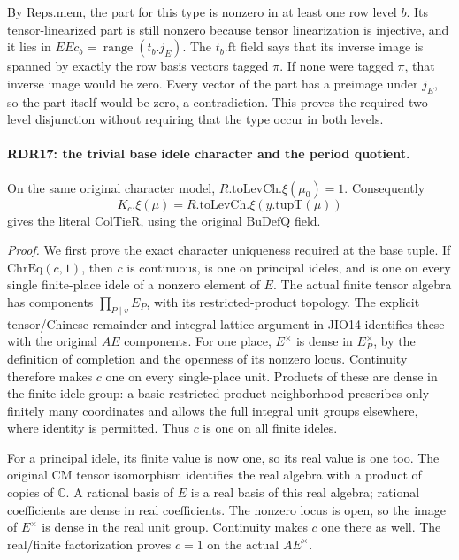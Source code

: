 By \(\mathrm{Reps.mem}\), the part for this type is nonzero
in at least one row level \(b\).  Its tensor-linearized part
is still nonzero because tensor linearization is injective,
and it lies in \(EEc_b=\operatorname{range}(t_b.j_E)\).
The \(t_b.\mathrm{ft}\) field says that its inverse image
is spanned by exactly the row basis vectors tagged \(\pi\).
If none were tagged \(\pi\), that inverse image would be
zero.  Every vector of the part has a preimage under \(j_E\),
so the part itself would be zero, a contradiction.  This
proves the required two-level disjunction without requiring
that the type occur in both levels.

\paragraph{RDR17: the trivial base idele character and the period quotient.}
\label{claim:RDR17}
On the same original character model,
\(R.\mathrm{toLevCh}.\xi(\mu_0)=1\).  Consequently
\[
 K_c.\xi(\mu)=R.\mathrm{toLevCh}.\xi(y.\mathrm{tupT}(\mu))
                                                               \tag{RDR.24}
\]
gives the literal \(\mathrm{ColTieR}\), using the original
\(\mathrm{BuDefQ}\) field.

\emph{Proof.}
We first prove the exact character uniqueness required at the
base tuple.  If \(\mathrm{ChrEq}(c,1)\), then \(c\) is
continuous, is one on principal ideles, and is one on every
single finite-place idele of a nonzero element of \(E\).
The actual finite tensor algebra has components
\(\prod_{P\mid v}E_P\), with its restricted-product topology.
The explicit tensor/Chinese-remainder and integral-lattice
argument in JIO14 identifies these with the original
\(AE\) components.  For one place, \(E^\times\) is dense
in \(E_P^\times\), by the definition of completion and the
openness of its nonzero locus.  Continuity therefore makes
\(c\) one on every single-place unit.  Products of these
are dense in the finite idele group: a basic restricted-product
neighborhood prescribes only finitely many coordinates and
allows the full integral unit groups elsewhere, where identity
is permitted.  Thus \(c\) is one on all finite ideles.

For a principal idele, its finite value is now one, so its
real value is one too.  The original CM tensor isomorphism
identifies the real algebra with a product of copies of
\(\mathbb C\).  A rational basis of \(E\) is a real basis
of this real algebra; rational coefficients are dense in
real coefficients.  The nonzero locus is open, so the image
of \(E^\times\) is dense in the real unit group.  Continuity
makes \(c\) one there as well.  The real/finite factorization
proves \(c=1\) on the actual \(AE^\times\).

